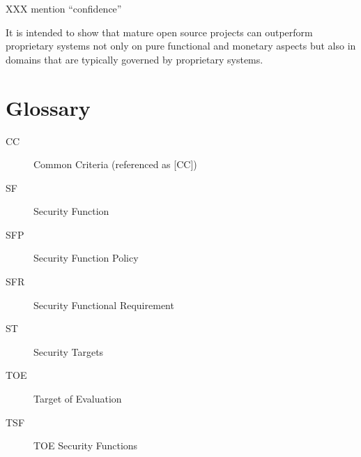 \documentclass[10pt,a4paper,english]{scrbook}
\begin{document}
XXX mention ``confidence''

It is intended to show that mature open source projects can outperform
proprietary systems not only on pure functional and monetary aspects but also
in domains that are typically governed by proprietary systems.



\hypertarget{glossary}{}
\chapter{Glossary}
\begin{description}
\item[CC]

Common Criteria (referenced as {[}CC])

\item[SF]

Security Function

\item[SFP]

Security Function Policy

\item[SFR]

Security Functional Requirement

\item[ST]

Security Targets

\item[TOE]

Target of Evaluation

\item[TSF]

TOE Security Functions

\end{description}
\end{document}
